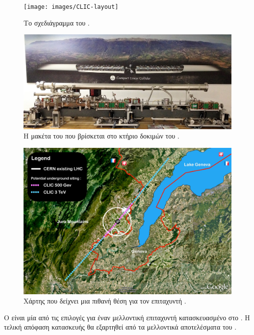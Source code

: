 \begin{figure}[tph]
\texttt{[image: images/CLIC-layout]}
\centering
\caption{Το σχεδιάγραμμα του .}
\label{img:CLIC-layout}
\end{figure}

\begin{figure}[tph]
\includegraphics[width=\linewidth]{images/CLIC-maquette}
\centering
\caption[Η μακέτα του .]
{Η μακέτα του  που βρίσκεται στο κτήριο δοκιμών  του .}
\label{img:CLIC-maquette}
\end{figure}

\begin{figure}[tph]
\includegraphics[width=\linewidth]{images/CLIC-potential-location}
\centering
\caption{Χάρτης που δείχνει μια πιθανή θέση για τον επιταχυντή  \cite{Aicheler2012}.}
\label{img:CLIC-potential-location}
\end{figure}

Ο  είναι μία από τις επιλογές για έναν μελλοντική επιταχυντή κατασκευασμένο στο . 
Η τελική απόφαση κατασκευής θα εξαρτηθεί από τα μελλοντικά αποτελέσματα του .

